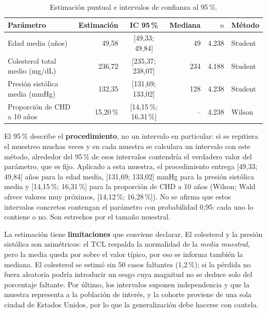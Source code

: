 \documentclass[11pt,a4paper]{article}
\begin{document}
\begin{table}[H]
\centering
\small
\caption{Estimación puntual e intervalos de confianza al 95\,\%.}
\label{tab:ic}
\setlength{\tabcolsep}{4pt}
\begin{tabular}{lrcrrl}
\toprule
\textbf{Parámetro} & \textbf{Estimación} & \textbf{IC 95\,\%} & \textbf{Mediana} & \textbf{$n$} & \textbf{Método} \\
\midrule
Edad media (años)              & 49{,}58     & [49{,}33; 49{,}84]          & 49  & 4.238 & Student \\
Colesterol total medio (mg/dL) & 236{,}72    & [235{,}37; 238{,}07]        & 234 & 4.188 & Student \\
Presión sistólica media (mmHg) & 132{,}35    & [131{,}69; 133{,}02]        & 128 & 4.238 & Student \\
Proporción de CHD a 10 años    & 15{,}20\,\% & [14{,}15\,\%; 16{,}31\,\%]  & --  & 4.238 & Wilson \\
\bottomrule
\end{tabular}
\end{table}

El 95\,\% describe el \textbf{procedimiento}, no un intervalo en particular: si se repitiera el muestreo
muchas veces y en cada muestra se calculara un intervalo con este método, alrededor del 95\,\% de esos
intervalos contendría el verdadero valor del parámetro, que es fijo. Aplicado a esta muestra, el procedimiento
entrega [49{,}33; 49{,}84] años para la edad media, [131{,}69; 133{,}02] mmHg para la presión sistólica media y
[14{,}15\,\%; 16{,}31\,\%] para la proporción de CHD a 10 años (Wilson; Wald ofrece valores muy próximos,
[14{,}12\,\%; 16{,}28\,\%]). No se afirma que estos intervalos concretos contengan el parámetro con
probabilidad 0{,}95: cada uno lo contiene o no. Son estrechos por el tamaño muestral.

La estimación tiene \textbf{limitaciones} que conviene declarar. El colesterol y la presión sistólica son
asimétricos: el TCL respalda la normalidad de la \textit{media muestral}, pero la media queda por sobre el
valor típico, por eso se informa también la mediana. El colesterol se estimó sin 50 casos faltantes
(1{,}2\,\%); si la pérdida no fuera aleatoria podría introducir un sesgo cuya magnitud no se deduce solo del porcentaje faltante. Por último, los
intervalos suponen independencia y que la muestra representa a la población de interés, y la cohorte proviene de una sola
ciudad de Estados Unidos, por lo que la generalización debe hacerse con cautela.
\end{document}
